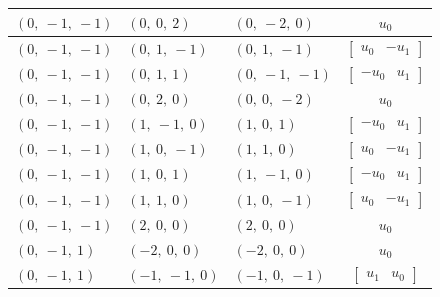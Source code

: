 \documentclass[11pt]{article}
\theoremstyle{definition}
\begin{document}
\begin{longtable}{|l|l|l|c|}
    \hline
    $\left( 0, \  -1, \  -1\right)$ & $\left( 0, \  0, \  2\right)$ & $\left( 0, \  -2, \  0\right)$ & $u_{0}$ \\
    \hline
    $\left( 0, \  -1, \  -1\right)$ & $\left( 0, \  1, \  -1\right)$ & $\left( 0, \  1, \  -1\right)$ & $\left[\begin{matrix}u_{0} & - u_{1}\end{matrix}\right]$ \\
    \hline
    $\left( 0, \  -1, \  -1\right)$ & $\left( 0, \  1, \  1\right)$ & $\left( 0, \  -1, \  -1\right)$ & $\left[\begin{matrix}- u_{0} & u_{1}\end{matrix}\right]$ \\
    \hline
    $\left( 0, \  -1, \  -1\right)$ & $\left( 0, \  2, \  0\right)$ & $\left( 0, \  0, \  -2\right)$ & $u_{0}$ \\
    \hline
    $\left( 0, \  -1, \  -1\right)$ & $\left( 1, \  -1, \  0\right)$ & $\left( 1, \  0, \  1\right)$ & $\left[\begin{matrix}- u_{0} & u_{1}\end{matrix}\right]$ \\
    \hline
    $\left( 0, \  -1, \  -1\right)$ & $\left( 1, \  0, \  -1\right)$ & $\left( 1, \  1, \  0\right)$ & $\left[\begin{matrix}u_{0} & - u_{1}\end{matrix}\right]$ \\
    \hline
    $\left( 0, \  -1, \  -1\right)$ & $\left( 1, \  0, \  1\right)$ & $\left( 1, \  -1, \  0\right)$ & $\left[\begin{matrix}- u_{0} & u_{1}\end{matrix}\right]$ \\
    \hline
    $\left( 0, \  -1, \  -1\right)$ & $\left( 1, \  1, \  0\right)$ & $\left( 1, \  0, \  -1\right)$ & $\left[\begin{matrix}u_{0} & - u_{1}\end{matrix}\right]$ \\
    \hline
    $\left( 0, \  -1, \  -1\right)$ & $\left( 2, \  0, \  0\right)$ & $\left( 2, \  0, \  0\right)$ & $u_{0}$ \\
    \hline
    $\left( 0, \  -1, \  1\right)$ & $\left( -2, \  0, \  0\right)$ & $\left( -2, \  0, \  0\right)$ & $u_{0}$ \\
    \hline
    $\left( 0, \  -1, \  1\right)$ & $\left( -1, \  -1, \  0\right)$ & $\left( -1, \  0, \  -1\right)$ & $\left[\begin{matrix}u_{1} & u_{0}\end{matrix}\right]$ \\

\end{longtable}
\end{document}
